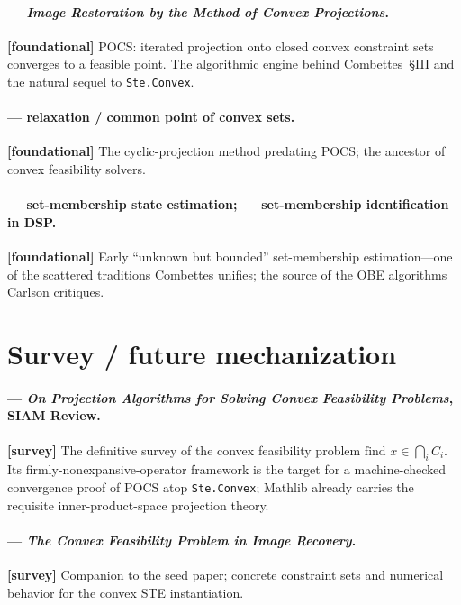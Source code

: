 \documentclass[11pt]{article}
\begin{document}
\paragraph{\citet{youla1982} --- \emph{Image Restoration by the Method
of Convex Projections}.} \textbf{[foundational]}
POCS: iterated projection onto closed convex constraint sets converges
to a feasible point. The algorithmic engine behind Combettes~\S III and
the natural sequel to \texttt{Ste.Convex}.

\paragraph{\citet{bregman1967} --- relaxation / common point of convex
sets.} \textbf{[foundational]}
The cyclic-projection method predating POCS; the ancestor of convex
feasibility solvers.

\paragraph{\citet{schweppe1968} --- set-membership state estimation;
\citet{deller1989} --- set-membership identification in DSP.}
\textbf{[foundational]}
Early ``unknown but bounded'' set-membership estimation---one of the
scattered traditions Combettes unifies; the source of the OBE algorithms
Carlson critiques.

\section*{Survey / future mechanization}

\paragraph{\citet{bauschke1996} --- \emph{On Projection Algorithms for
Solving Convex Feasibility Problems}, SIAM Review.} \textbf{[survey]}
The definitive survey of the convex feasibility problem
$\text{find }x\in\bigcap_i C_i$. Its firmly-nonexpansive-operator
framework is the target for a machine-checked convergence proof of POCS
atop \texttt{Ste.Convex}; Mathlib already carries the requisite
inner-product-space projection theory.

\paragraph{\citet{combettes1993numerical} --- \emph{The Convex
Feasibility Problem in Image Recovery}.} \textbf{[survey]}
Companion to the seed paper; concrete constraint sets and numerical
behavior for the convex STE instantiation.
\end{document}
